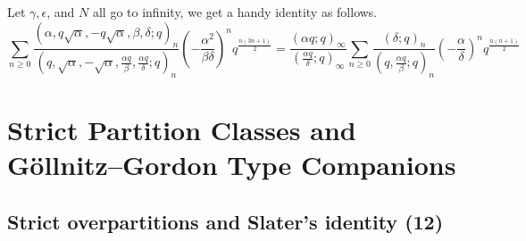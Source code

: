 \documentclass[11pt]{amsart}
\theoremstyle{definition}
\theoremstyle{remark}
\numberwithin{equation}{section}
\begin{document}
Let $\gamma,\epsilon$, and $N$ all go to infinity, we get a handy identity as follows.
\begin{equation}\label{eq:mastersubs}
\sum_{n\geq0}\frac{(\alpha,q\sqrt{\alpha},-q\sqrt{\alpha},\beta,\delta;q)_{n}}{(q,\sqrt{\alpha},-\sqrt{\alpha},\frac{\alpha q}{\beta},\frac{\alpha q}{\delta};q)_n}\left(-\frac{\alpha^2}{\beta\delta}\right)^nq^{\frac{n(3n+1)}{2}}=\frac{(\alpha q;q)_{\infty}}{(\frac{\alpha q}{\delta};q)_{\infty}}\sum_{n\geq0}\frac{(\delta;q)_{n}}{(q,\frac{\alpha q}{\beta};q)_{n}}\left(-\frac{\alpha}{\delta}\right)^nq^{\frac{n(n+1)}{2}}
\end{equation}

\section{Strict Partition Classes and G\"ollnitz--Gordon Type Companions}\label{sec:strictGG}

\subsection{Strict overpartitions and Slater's identity (12)}\label{sec:slater12}
\end{document}
